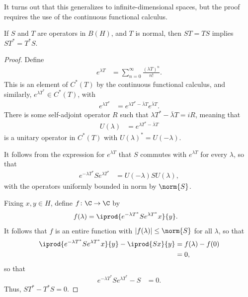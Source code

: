 \documentclass[10pt]{mypackage}
\begin{document}
It turns out that this generalizes to infinite-dimensional spaces, but the proof requires the use of the continuous functional calculus.
\begin{proposition}
  If $S$ and $T$ are operators in $B(H)$, and $T$ is normal, then $ST = TS$ implies $ST^{\ast} = T^{\ast}S$.
\end{proposition}
\begin{proof}
  Define
  \begin{align*}
    e^{\lambda T} &= \sum_{n=0}^{\infty} \frac{\left( \lambda T \right)^{n}}{n!}.
  \end{align*}
  This is an element of $C^{\ast}(T)$ by the continuous functional calculus, and similarly, $e^{\lambda T^{\ast}}\in C^{\ast}\left( T \right)$, with
  \begin{align*}
    e^{\lambda T^{\ast}} &= e^{\lambda T^{\ast} - \overline{\lambda}T} e^{ \overline{\lambda}T }.
  \end{align*}
  There is some self-adjoint operator $R$ such that $\lambda T^{\ast} - \overline{\lambda}T = iR$, meaning that
  \begin{align*}
    U(\lambda) &= e^{\lambda T^{\ast}-  \overline{\lambda}T}
  \end{align*}
  is a unitary operator in $C^{\ast}(T)$ with $U(\lambda)^{\ast} = U(-\lambda)$.

  It follows from the expression for $e^{\lambda T}$ that $S$ commutes with $e^{\lambda T}$ for every $\lambda$, so that
  \begin{align*}
    e^{-\lambda T^{\ast}}S e^{\lambda T^{\ast}} &= U(-\lambda)SU(\lambda),
  \end{align*}
  with the operators uniformly bounded in norm by $\norm{S}$.

  Fixing $x,y\in H$, define $f\colon \C\rightarrow \C$ by
  \begin{align*}
    f(\lambda) &= \iprod{e^{-\lambda T^{\ast}}S e^{\lambda T^{\ast}}x}{y}.
  \end{align*}
  It follows that $f$ is an entire function with $\left\vert f(\lambda) \right\vert\leq \norm{S}$ for all $\lambda$, so that
  \begin{align*}
    \iprod{e^{-\lambda T^{\ast}}S e^{\lambda T^{\ast}}x}{y} - \iprod{Sx}{y} &= f(\lambda)-f(0)\\
                                                                            &= 0,
  \end{align*}
  so that
  \begin{align*}
    e^{-\lambda T^{\ast}}Se^{\lambda T^{\ast}}- S &= 0.
  \end{align*}
  Thus, $ST^{\ast} - T^{\ast}S = 0$.
\end{proof}
\end{document}

